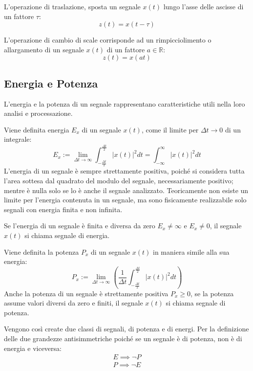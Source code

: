 \documentclass{article}
\numberwithin{equation}{subsection}
\begin{document}
L'operazione di traslazione, sposta un segnale $x(t)$ lungo l'asse delle ascisse di un fattore $\tau$:
\begin{equation*}
    z(t)=x(t-\tau)
\end{equation*}

L'operazione di cambio di scale corrisponde ad un rimpicciolimento o allargamento di un segnale $x(t)$ di un fattore $a\in\mathbb{R}$:
\begin{equation*}
    z(t)=x(at)
\end{equation*}

\subsection{Energia e Potenza}

L'energia e la potenza di un segnale rappresentano caratteristiche utili nella loro analisi e processazione. 

Viene definita energia $E_x$ di un segnale $x(t)$, come il limite per $\Delta t\to0$ di un integrale:
\begin{equation}
    E_x:=\lim_{\Delta t\to\infty}\displaystyle\int_{-\frac{\Delta t}{2}}^{\frac{\Delta t}{2}}|x(t)|^2dt=\int_{-\infty}^{\infty}|x(t)|^2dt
\end{equation}
L'energia di un segnale è sempre strettamente positiva, poiché si considera tutta l'area sottesa dal quadrato del modulo del segnale, necessariamente positivo; mentre è nulla 
solo se lo è anche il segnale analizzato. Teoricamente non esiste un limite per l'energia contenuta in un segnale, ma sono fisicamente realizzabile solo segnali con energia 
finita e non infinita. 

Se l'energia di un segnale è finita e diversa da zero $E_x\neq\infty$ e $E_x\neq0$, il segnale $x(t)$ si chiama segnale di energia.


Viene definita la potenza $P_x$ di un segnale $x(t)$ in maniera simile alla sua energia:
\begin{equation}
    P_x:=\lim_{\Delta t\to\infty}\displaystyle\left(\frac{1}{\Delta t}\int_{-\frac{\Delta t}{2}}^{\frac{\Delta t}{2}}|x(t)|^2dt\right)
\end{equation}
Anche la potenza di un segnale è strettamente positiva $P_x\geq0$, se la potenza assume valori diversi da zero e finiti, il segnale $x(t)$ si chiama segnale di potenza. 

Vengono così create due classi di segnali, di potenza e di energi. Per la definizione delle due grandezze antisimmetriche poiché se un segnale è di potenza, non è di energia 
e viceversa: 
\begin{gather*}
    E\implies\neg P\\
    P\implies\neg E
\end{gather*}
\end{document}

